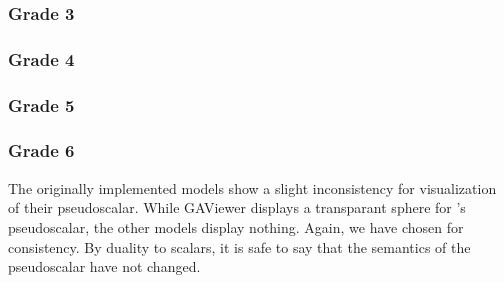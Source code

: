 \subsubsection{Grade 3}


\subsubsection{Grade 4}


\subsubsection{Grade 5}


\subsubsection{Grade 6}
The originally implemented models show a slight inconsistency for visualization of their pseudoscalar.  While GAViewer displays a transparant sphere for \ega{}'s pseudoscalar, the other models display nothing.  Again, we have chosen for consistency.  By duality to scalars, it is safe to say that the semantics of the pseudoscalar have not changed.
